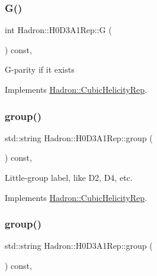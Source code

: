 \subsubsection{\texorpdfstring{G()}{G()}\hspace{0.1cm}{\footnotesize\ttfamily [3/3]}}
{\footnotesize\ttfamily int Hadron\+::\+H0\+D3\+A1\+Rep\+::G (\begin{DoxyParamCaption}{ }\end{DoxyParamCaption}) const\hspace{0.3cm}{\ttfamily [inline]}, {\ttfamily [virtual]}}

G-\/parity if it exists 

Implements \mbox{\hyperlink{structHadron_1_1CubicHelicityRep_a50689f42be1e6170aa8cf6ad0597018b}{Hadron\+::\+Cubic\+Helicity\+Rep}}.

\mbox{\label{structHadron_1_1H0D3A1Rep_acb3ae7caf69d50372d06639f12c8c72c}} 
\subsubsection{\texorpdfstring{group()}{group()}\hspace{0.1cm}{\footnotesize\ttfamily [1/5]}}
{\footnotesize\ttfamily std\+::string Hadron\+::\+H0\+D3\+A1\+Rep\+::group (\begin{DoxyParamCaption}{ }\end{DoxyParamCaption}) const\hspace{0.3cm}{\ttfamily [inline]}, {\ttfamily [virtual]}}

Little-\/group label, like D2, D4, etc. 

Implements \mbox{\hyperlink{structHadron_1_1CubicHelicityRep_a101a7d76cd8ccdad0f272db44b766113}{Hadron\+::\+Cubic\+Helicity\+Rep}}.

\mbox{\label{structHadron_1_1H0D3A1Rep_acb3ae7caf69d50372d06639f12c8c72c}} 
\subsubsection{\texorpdfstring{group()}{group()}\hspace{0.1cm}{\footnotesize\ttfamily [2/5]}}
{\footnotesize\ttfamily std\+::string Hadron\+::\+H0\+D3\+A1\+Rep\+::group (\begin{DoxyParamCaption}{ }\end{DoxyParamCaption}) const\hspace{0.3cm}{\ttfamily [inline]}, {\ttfamily [virtual]}}

